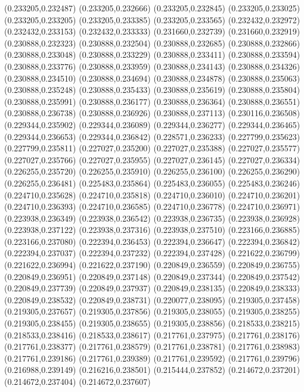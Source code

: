 (0.233205,0.232487)
(0.233205,0.232666)
(0.233205,0.232845)
(0.233205,0.233025)
(0.233205,0.233205)
(0.233205,0.233385)
(0.233205,0.233565)
(0.232432,0.232972)
(0.232432,0.233153)
(0.232432,0.233333)
(0.231660,0.232739)
(0.231660,0.232919)
(0.230888,0.232323)
(0.230888,0.232504)
(0.230888,0.232685)
(0.230888,0.232866)
(0.230888,0.233048)
(0.230888,0.233229)
(0.230888,0.233411)
(0.230888,0.233594)
(0.230888,0.233776)
(0.230888,0.233959)
(0.230888,0.234143)
(0.230888,0.234326)
(0.230888,0.234510)
(0.230888,0.234694)
(0.230888,0.234878)
(0.230888,0.235063)
(0.230888,0.235248)
(0.230888,0.235433)
(0.230888,0.235619)
(0.230888,0.235804)
(0.230888,0.235991)
(0.230888,0.236177)
(0.230888,0.236364)
(0.230888,0.236551)
(0.230888,0.236738)
(0.230888,0.236926)
(0.230888,0.237113)
(0.230116,0.236508)
(0.229344,0.235902)
(0.229344,0.236089)
(0.229344,0.236277)
(0.229344,0.236465)
(0.229344,0.236653)
(0.229344,0.236842)
(0.228571,0.236233)
(0.227799,0.235623)
(0.227799,0.235811)
(0.227027,0.235200)
(0.227027,0.235388)
(0.227027,0.235577)
(0.227027,0.235766)
(0.227027,0.235955)
(0.227027,0.236145)
(0.227027,0.236334)
(0.226255,0.235720)
(0.226255,0.235910)
(0.226255,0.236100)
(0.226255,0.236290)
(0.226255,0.236481)
(0.225483,0.235864)
(0.225483,0.236055)
(0.225483,0.236246)
(0.224710,0.235628)
(0.224710,0.235818)
(0.224710,0.236010)
(0.224710,0.236201)
(0.224710,0.236393)
(0.224710,0.236585)
(0.224710,0.236778)
(0.224710,0.236971)
(0.223938,0.236349)
(0.223938,0.236542)
(0.223938,0.236735)
(0.223938,0.236928)
(0.223938,0.237122)
(0.223938,0.237316)
(0.223938,0.237510)
(0.223166,0.236885)
(0.223166,0.237080)
(0.222394,0.236453)
(0.222394,0.236647)
(0.222394,0.236842)
(0.222394,0.237037)
(0.222394,0.237232)
(0.222394,0.237428)
(0.221622,0.236799)
(0.221622,0.236994)
(0.221622,0.237190)
(0.220849,0.236559)
(0.220849,0.236755)
(0.220849,0.236951)
(0.220849,0.237148)
(0.220849,0.237344)
(0.220849,0.237542)
(0.220849,0.237739)
(0.220849,0.237937)
(0.220849,0.238135)
(0.220849,0.238333)
(0.220849,0.238532)
(0.220849,0.238731)
(0.220077,0.238095)
(0.219305,0.237458)
(0.219305,0.237657)
(0.219305,0.237856)
(0.219305,0.238055)
(0.219305,0.238255)
(0.219305,0.238455)
(0.219305,0.238655)
(0.219305,0.238856)
(0.218533,0.238215)
(0.218533,0.238416)
(0.218533,0.238617)
(0.217761,0.237975)
(0.217761,0.238176)
(0.217761,0.238377)
(0.217761,0.238579)
(0.217761,0.238781)
(0.217761,0.238983)
(0.217761,0.239186)
(0.217761,0.239389)
(0.217761,0.239592)
(0.217761,0.239796)
(0.216988,0.239149)
(0.216216,0.238501)
(0.215444,0.237852)
(0.214672,0.237201)
(0.214672,0.237404)
(0.214672,0.237607)
